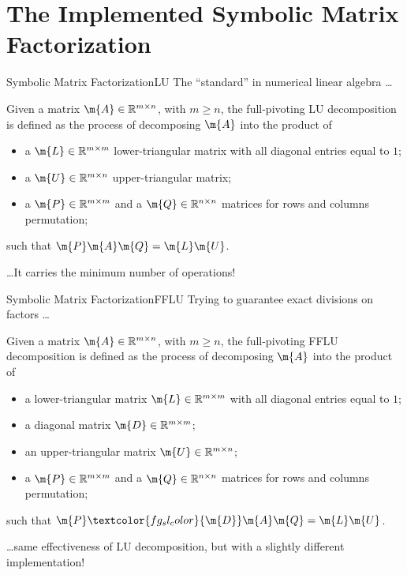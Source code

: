 
\section{The Implemented Symbolic Matrix Factorization}

\begin{frame}{Symbolic Matrix Factorization}{\acf{LU}}
  The ``standard'' in numerical linear algebra \dots
  \begin{bbox}
    Given a matrix $\m{A} \in \mathbb{R}^{m \times n}$, with $m \geq n$, the full-pivoting \acs{LU} decomposition is defined as the process of decomposing $\m{A}$ into the product of
    \begin{itemize}
      \item a $\m{L} \in \mathbb{R}^{m \times m}$ lower-triangular matrix with all diagonal entries equal to $1$;
      \item a $\m{U} \in \mathbb{R}^{m \times n}$ upper-triangular matrix;
      \item a $\m{P} \in \mathbb{R}^{m \times m}$ and a $\m{Q} \in \mathbb{R}^{n \times n}$ matrices for rows and columns permutation;
    \end{itemize}
    such that $\m{P}\m{A}\m{Q} = \m{L}\m{U}$.
  \end{bbox}
  \dots It carries the minimum number of operations!
\end{frame}

\begin{frame}{Symbolic Matrix Factorization}{\acf{FFLU}}
  Trying to guarantee exact divisions on factors \dots
  \begin{bbox}
    Given a matrix $\m{A} \in \mathbb{R}^{m \times n}$, with $m \geq n$, the full-pivoting \acs{FFLU} decomposition is defined as the process of decomposing $\m{A}$ into the product of
    \begin{itemize}
      \item a lower-triangular matrix $\m{L} \in \mathbb{R}^{m \times m}$ with all diagonal entries equal to $1$;
      \item \textcolor{fg_sl_color}{a diagonal matrix $\m{D} \in \mathbb{R}^{m \times m}$;}
      \item an upper-triangular matrix $\m{U} \in \mathbb{R}^{m \times n}$;
      \item a $\m{P} \in \mathbb{R}^{m \times m}$ and a $\m{Q} \in \mathbb{R}^{n \times n}$ matrices for rows and columns permutation;
    \end{itemize}
    such that $\m{P}\textcolor{fg_sl_color}{\m{D}}\m{A}\m{Q} = \m{L}\m{U}$.
  \end{bbox}
  \dots same effectiveness of \acs{LU} decomposition, but with a slightly different implementation!
\end{frame}

